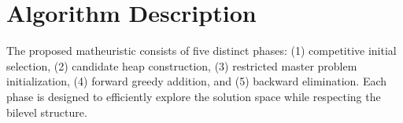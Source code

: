 \documentclass[11pt,a4paper]{article}
\begin{document}
\section{Algorithm Description}

The proposed matheuristic consists of five distinct phases: (1) competitive initial selection, (2) candidate heap construction, (3) restricted master problem initialization, (4) forward greedy addition, and (5) backward elimination. Each phase is designed to efficiently explore the solution space while respecting the bilevel structure.

\end{document}

